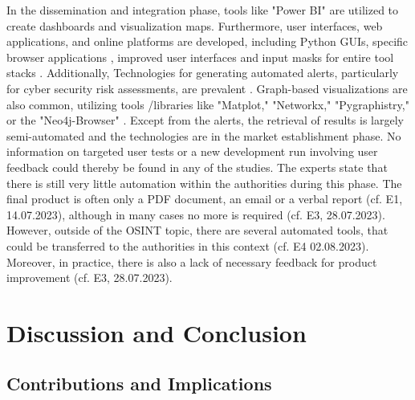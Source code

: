 \documentclass[10pt]{article}
\begin{document}
In the dissemination and integration phase, tools like "Power BI" \cite{Tao.2023}
are utilized to create dashboards and visualization maps. Furthermore, user interfaces,
web applications, and online platforms are developed, including Python GUIs,
specific browser applications \cite{Elmas.2022},
improved user interfaces and input masks for entire tool stacks \cite{Arjun.2020}.
Additionally, Technologies for generating automated alerts, particularly for cyber security risk assessments,
are prevalent \cite{Ahuja.2022}. Graph-based visualizations are also common, utilizing tools
/libraries like "Matplot," "Networkx," "Pygraphistry," or the "Neo4j-Browser" \cite{Middleton.2020}.
Except from the alerts, the retrieval of results is largely semi-automated and the technologies are in the
market establishment phase. No information on targeted user tests or a new development run involving
user feedback could thereby be found in any of the studies. The experts state that there is still very little
automation within the authorities during this phase. The final product is often only a PDF document,
an email or a verbal report (cf. E1, 14.07.2023), although in many cases no more is required (cf. E3, 28.07.2023).
However, outside of the OSINT topic, there are several automated tools, that could be transferred
to the authorities in this context (cf. E4 02.08.2023). Moreover, in practice, there is also a lack of
necessary feedback for product improvement (cf. E3, 28.07.2023).

\section{Discussion and Conclusion} \label{sec:discussion}
\subsection{Contributions and Implications}
\end{document}
